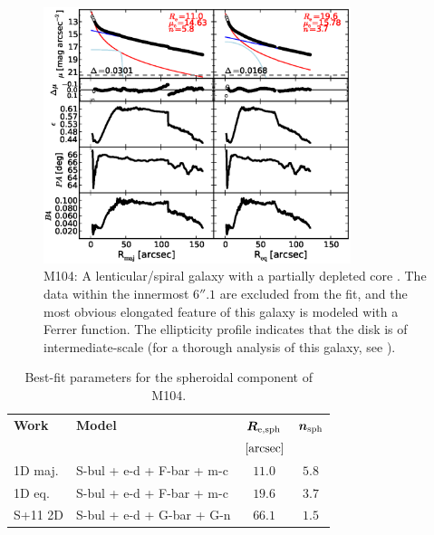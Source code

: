 \documentclass[preprint2]{emulateapj}
\newcommand{\fitfigurewidth}{0.8\textwidth}
\begin{document}
  \begin{figure}[h]
  \begin{center}
  \includegraphics[width=\fitfigurewidth]{m104_1Dfit.eps}
  \caption{M104: 
  A lenticular/spiral galaxy with a partially depleted core \citep{jardel2011}. 
  The data within the innermost $6''.1$ are excluded from the fit, 
  and the most obvious elongated feature of this galaxy is modeled with a Ferrer function. 
  The ellipticity profile indicates that the disk is of intermediate-scale 
  (for a thorough analysis of this galaxy, see \citealt{gadottisanchezjanssen2012}).
  }
  \end{center}
  \end{figure}
  
  \begin{table}[h]
  \small
  \caption{Best-fit parameters for the spheroidal component of M104.}
  \begin{center}
  \begin{tabular}{llcc}
  \hline
  {\bf Work} & {\bf Model}   & $\bm R_{\rm e,sph}$    & $\bm n_{\rm sph}$ \\
    &  &  $[\rm arcsec]$ & \\
  \hline
  1D maj. & S-bul + e-d + F-bar + m-c  & $11.0$  &  $5.8$ \\
  1D eq.  & S-bul + e-d + F-bar + m-c  & $19.6$  &  $3.7$ \\
  \hline
  S+11 2D         & S-bul + e-d + G-bar + G-n  & $66.1$  &  $1.5$ \\
  \hline
  \end{tabular}
  \end{center}
  \label{tab:m104}
  \end{table}
\end{document}
